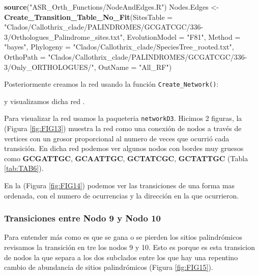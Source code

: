 \documentclass[
]{book}
\newenvironment{Shaded}{\begin{snugshade}}{\end{snugshade}}
\newcommand{\AttributeTok}[1]{\textcolor[rgb]{0.13,0.29,0.53}{#1}}
\newcommand{\FunctionTok}[1]{\textcolor[rgb]{0.13,0.29,0.53}{\textbf{#1}}}
\newcommand{\NormalTok}[1]{#1}
\newcommand{\OtherTok}[1]{\textcolor[rgb]{0.56,0.35,0.01}{#1}}
\newcommand{\StringTok}[1]{\textcolor[rgb]{0.31,0.60,0.02}{#1}}
\begin{document}
\begin{Shaded}
\begin{Highlighting}[]
\FunctionTok{source}\NormalTok{(}\StringTok{"ASR\_Orth\_Functions/NodeAndEdges.R"}\NormalTok{)}
\NormalTok{Nodes.Edges }\OtherTok{\textless{}{-}} \FunctionTok{Create\_Transition\_Table\_No\_Fit}\NormalTok{(}\AttributeTok{SitesTable =} \StringTok{"Clados/Callothrix\_clade/PALINDROMES/GCGATCGC/336{-}3/Orthologues\_Palindrome\_sites.txt"}\NormalTok{,}
                                \AttributeTok{EvolutionModel =} \StringTok{"F81"}\NormalTok{,}
                                \AttributeTok{Method =} \StringTok{"bayes"}\NormalTok{,}
                                \AttributeTok{Phylogeny =} \StringTok{"Clados/Callothrix\_clade/SpeciesTree\_rooted.txt"}\NormalTok{,}
                                \AttributeTok{OrthoPath =} \StringTok{"Clados/Callothrix\_clade/PALINDROMES/GCGATCGC/336{-}3/Only\_ORTHOLOGUES/"}\NormalTok{,}
                                \AttributeTok{OutName =} \StringTok{"All\_RF"}\NormalTok{)}
\end{Highlighting}
\end{Shaded}

Posteriormente creamos la red usando la función \texttt{Create\_Network()}:

y visualizamos dicha red .

Para visualizar la red usamos la paqueteria \texttt{networkD3}. Hicimos 2 figuras, la (Figura \ref{fig:FIG13}) muestra la red como una conexión de nodos a través de vertices con un grosor proporcional al numero de veces que ocurrió cada transición. En dicha red podemos ver algunos nodos con bordes muy gruesos como \textbf{GCGATTGC}, \textbf{GCAATTGC}, \textbf{GCTATCGC}, \textbf{GCTATTGC} (Tabla \ref{tab:TAB6}).

En la (Figura \ref{fig:FIG14}) podemos ver las transiciones de una forma mas ordenada, con el numero de ocurrencias y la dirección en la que ocurrieron.

\hypertarget{transiciones-entre-nodo-9-y-nodo-10}{%
\subsubsection{Transiciones entre Nodo 9 y Nodo 10}\label{transiciones-entre-nodo-9-y-nodo-10}}

Para entender más como es que se gana o se pierden los sitios palindrómicos revisamos la transición en tre los nodos 9 y 10. Esto es porque es esta transicion de nodos la que separa a los dos subclados entre los que hay una repentino cambio de abundancia de sitios palindrómicos (Figura \ref{fig:FIG15}).
\end{document}
